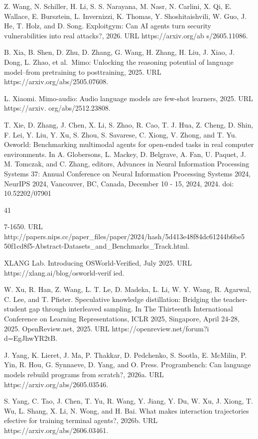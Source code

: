 \documentclass[
  10
]{article}
\begin{document}
Z. Wang, N. Schiller, H. Li, S. S. Narayana, M. Nasr, N. Carlini, X. Qi,
E. Wallace, E. Bursztein, L. Invernizzi, K. Thomas, Y. Shoshitaishvili,
W. Guo, J. He, T. Holz, and D. Song. Exploitgym: Can AI agents turn
security vulnerabilities into real attacks?, 2026. URL
https://arxiv.org/ab s/2605.11086.

B. Xia, B. Shen, D. Zhu, D. Zhang, G. Wang, H. Zhang, H. Liu, J. Xiao,
J. Dong, L. Zhao, et al.~Mimo: Unlocking the reasoning potential of
language model--from pretraining to posttraining, 2025. URL
https://arxiv.org/abs/2505.07608.

L. Xiaomi. Mimo-audio: Audio language models are few-shot learners,
2025. URL https://arxiv. org/abs/2512.23808.

T. Xie, D. Zhang, J. Chen, X. Li, S. Zhao, R. Cao, T. J. Hua, Z. Cheng,
D. Shin, F. Lei, Y. Liu, Y. Xu, S. Zhou, S. Savarese, C. Xiong, V.
Zhong, and T. Yu. Osworld: Benchmarking multimodal agents for open-ended
tasks in real computer environments. In A. Globersons, L. Mackey, D.
Belgrave, A. Fan, U. Paquet, J. M. Tomczak, and C. Zhang, editors,
Advances in Neural Information Processing Systems 37: Annual Conference
on Neural Information Processing Systems 2024, NeurIPS 2024, Vancouver,
BC, Canada, December 10 - 15, 2024, 2024. doi: 10.52202/07901

41

7-1650. URL
http://papers.nips.cc/paper\_files/paper/2024/hash/5d413e48f84dc61244b6be5
50f1cd8f5-Abstract-Datasets\_and\_Benchmarks\_Track.html.

XLANG Lab. Introducing OSWorld-Verified, July 2025. URL
https://xlang.ai/blog/osworld-verif ied.

W. Xu, R. Han, Z. Wang, L. T. Le, D. Madeka, L. Li, W. Y. Wang, R.
Agarwal, C. Lee, and T. Pfister. Speculative knowledge distillation:
Bridging the teacher-student gap through interleaved sampling. In The
Thirteenth International Conference on Learning Representations, ICLR
2025, Singapore, April 24-28, 2025. OpenReview.net, 2025. URL
https://openreview.net/forum?i d=EgJhwYR2tB.

J. Yang, K. Lieret, J. Ma, P. Thakkar, D. Pedchenko, S. Sootla, E.
McMilin, P. Yin, R. Hou, G. Synnaeve, D. Yang, and O. Press.
Programbench: Can language models rebuild programs from scratch?, 2026a.
URL https://arxiv.org/abs/2605.03546.

S. Yang, C. Tao, J. Chen, T. Yu, R. Wang, Y. Jiang, Y. Du, W. Xu, J.
Xiong, T. Wu, L. Shang, X. Li, N. Wong, and H. Bai. What makes
interaction trajectories efective for training terminal agents?, 2026b.
URL https://arxiv.org/abs/2606.03461.
\end{document}
